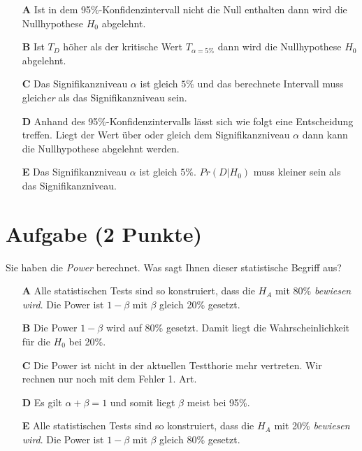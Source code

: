 \documentclass[a4paper, 9pt]{scrartcl}\usepackage[]{graphicx}\usepackage[]{xcolor}
\begin{document}
\begin{enumerate}
\item [\textbf{A} \msquare] Ist in dem 95\%-Konfidenzintervall nicht die Null enthalten dann wird die Nullhypothese $H_0$ abgelehnt.
\item [\textbf{B} \msquare] Ist $T_{D}$ höher als der kritische Wert $T_{\alpha = 5\%}$ dann wird die Nullhypothese $H_0$ abgelehnt.
\item [\textbf{C} \msquare] Das Signifikanzniveau $\alpha$ ist gleich $5\%$ und das berechnete Intervall muss gleich\textit{er} als das Signifikanzniveau sein.
\item [\textbf{D} \msquare] Anhand des 95\%-Konfidenzintervalls lässt sich wie folgt eine Entscheidung treffen. Liegt der Wert über oder gleich dem Signifikanzniveau $\alpha$ dann kann die Nullhypothese abgelehnt werden.
\item [\textbf{E} \msquare] Das Signifikanzniveau $\alpha$ ist gleich $5\%$. $Pr(D|H_0)$ muss kleiner sein als das Signifikanzniveau.
\end{enumerate}

\section{Aufgabe \hfill (2 Punkte)}

\ifcollection
\begin{flushright}
\tiny\vspace{-2Ex}
\textbf{\examinhaltstart}
\exammodulebiostat
\vspace{-1Ex}
\end{flushright}
\fi




Sie haben die \textit{Power} berechnet. Was sagt Ihnen dieser statistische Begriff aus?



\begin{enumerate}
\item [\textbf{A} \msquare] Alle statistischen Tests sind so konstruiert, dass die $H_A$ mit 80\% \textit{bewiesen wird}. Die Power ist $1-\beta$ mit $\beta$ gleich 20\% gesetzt.
\item [\textbf{B} \msquare] Die Power $1-\beta$ wird auf 80\% gesetzt. Damit liegt die Wahrscheinlichkeit für die $H_0$ bei 20\%.
\item [\textbf{C} \msquare] Die Power ist nicht in der aktuellen Testthorie mehr vertreten. Wir rechnen nur noch mit dem Fehler 1. Art.
\item [\textbf{D} \msquare] Es gilt $\alpha + \beta = 1$ und somit liegt $\beta$ meist bei 95\%.
\item [\textbf{E} \msquare] Alle statistischen Tests sind so konstruiert, dass die $H_A$ mit 20\% \textit{bewiesen wird}. Die Power ist $1-\beta$ mit $\beta$ gleich 80\% gesetzt.
\end{enumerate}
\end{document}
